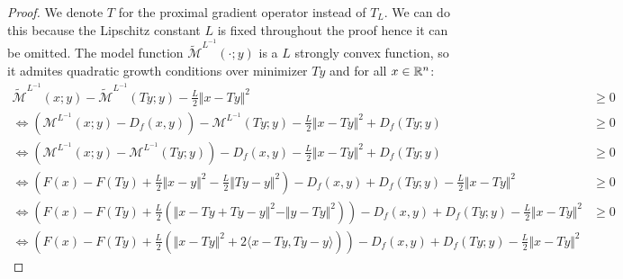 \documentclass[12pt]{article}
\begin{document}
    \begin{proof}
        We denote $T$ for the proximal gradient operator instead of $T_L$. 
        We can do this because the Lipschitz constant $L$ is fixed throughout the proof hence it can be omitted. 
        The model function $\widetilde{\mathcal M}^{L^{-1}}(\cdot; y)$ is a $L$ strongly convex function, so it admites quadratic growth conditions over minimizer $Ty$ and for all $x \in \mathbb R^n$: 
        {\footnotesize
        \begin{align*}
            \widetilde{\mathcal M}^{L^{-1}}(x; y) - 
            \widetilde{\mathcal M}^{L^{-1}}(Ty; y)
            - 
            \frac{L}{2}\Vert x - Ty\Vert^2
            &\ge 
            0
            \\
            \iff
            \left(
                \mathcal M^{L^{-1}}(x; y) - D_f(x, y)
            \right) - 
            \mathcal M^{L^{-1}}(Ty; y) 
            - 
            \frac{L}{2}\Vert x - Ty\Vert^2
            + D_f(Ty; y)
            &\ge 0
            \\
            \iff 
            \left(
                \mathcal M^{L^{-1}}(x; y)
                - 
                \mathcal M^{L^{-1}}(Ty; y)
            \right)
            - 
            D_f(x, y) 
            - \frac{L}{2}\Vert x - Ty\Vert^2
            + D_f(Ty; y)
            &\ge 0
            \\
            \iff 
            \left(
                F(x) - F(Ty) 
                + 
                \frac{L}{2}\Vert x - y\Vert^2 - 
                \frac{L}{2}\Vert Ty - y\Vert^2
            \right)
            - D_f(x, y) 
            + D_f(Ty; y)
            - \frac{L}{2}\Vert x - Ty\Vert^2
            &\ge 0
            \\
            \iff 
            \left(
                F(x) - F(Ty) 
                + 
                \frac{L}{2}
                \left(
                    \Vert x - Ty + Ty - y\Vert^2
                    - 
                    \Vert y - Ty\Vert^2
                \right)
            \right)
            - D_f(x, y) 
            + D_f(Ty; y)
            - \frac{L}{2}\Vert x - Ty\Vert^2
            &\ge 0
            \\
            \iff 
            \left(
                F(x) - F(Ty) 
                + 
                \frac{L}{2}
                \left(
                    \Vert x - Ty\Vert^2 + 
                    2\langle x - Ty, Ty - y\rangle
                \right)
            \right)
            - D_f(x, y) 
            + D_f(Ty; y)
            - \frac{L}{2}\Vert x - Ty\Vert^2

\end{align*}}
\end{proof}
\end{document}
